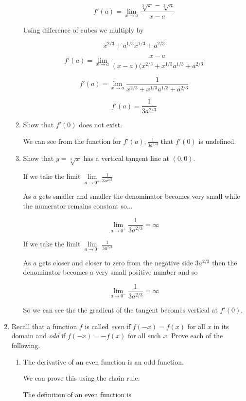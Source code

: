 \documentclass{article}
\begin{document}
\begin{enumerate}
\begin{enumerate}
				$$f'(a) = \lim \limits _{x \to a} \frac{\sqrt[3]{x} - \sqrt[3]{a}}{x-a}$$

				Using difference of cubes we multiply by

				$$x^{2/3} + a^{1/3}x^{1/3} + a^{2/3}$$

				$$f'(a) = \lim \limits _{x \to a} \frac{x - a}{(x-a)(x^{2/3}+x^{1/3}a^{1/3}+a^{2/3}}$$

				$$f'(a) = \lim \limits _{x \to a} \frac{1}{x^{2/3}+x^{1/3}a^{1/3}+a^{2/3}}$$

				$$f'(a) = \frac{1}{3a^{2/3}}$$

			\item Show that $f'(0)$ does not exist.

				We can see from the function for $f'(a), \frac{1}{3a^{2/3}}$ that $f'(0)$
				is undefined.

			\item Show that $y = \sqrt[3]{x}$ has a vertical tangent line at $(0,0)$.

				If we take the limit $\lim \limits _{a \to 0^{+}} \frac{1}{3a^{2/3}}$ 

				As $a$ gets smaller and smaller the denominator becomes very small while
				the numerator remains constant so...

				$$\lim \limits _{a \to 0^{+}} \frac{1}{3a^{2/3}} = \infty$$

				If we take the limit $\lim \limits _{a \to 0^{-}} \frac{1}{3a^{2/3}}$

				As $a$ gets closer and closer to zero from the negative side $3a^{2/3}$ then
				the denominator becomes a very small positive number and so

				$$\lim \limits _{a \to 0^{-}} \frac{1}{3a^{2/3}} = \infty$$

				So we can see the the gradient of the tangent becomes vertical at $f'(0)$.
		\end{enumerate}

		\item Recall that a function $f$ is called \emph{even} if $f(-x) = f(x)$ for all $x$ in its
			domain and \emph{odd} if $f(-x) = -f(x)$ for all such $x$. Prove each of the
			following.

		\begin{enumerate}
			\item The derivative of an even function is an odd function.

				We can prove this using the chain rule.

				The definition of an even function is


\end{enumerate}
\end{enumerate}
\end{document}
